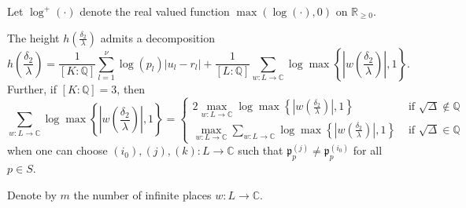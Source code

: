 Let $\log^+(\cdot)$ denote the real valued function $\max(\log(\cdot), 0)$ on $\mathbb{R}_{\geq 0}$. 

\begin{proposition}\label{prop:heightdecomp}
The height $h\left(\frac{\delta_2}{\lambda}\right)$ admits a decomposition
\[h\left(\frac{\delta_2}{\lambda}\right) = \frac{1}{[K:\mathbb{Q}]}\sum_{l = 1}^{\nu} \log(p_l)|u_l - r_l| + \frac{1}{[L:\mathbb{Q}]}\sum_{w :L \to \mathbb{C}} \log \max \left\{ \left|w\left(\frac{\delta_2}{\lambda}\right)\right|, 1\right\}.\]
Further, if $[K:\mathbb{Q}] = 3$, then
\[\sum_{w :L \to \mathbb{C}} \log \max \left\{ \left|w\left(\frac{\delta_2}{\lambda}\right)\right|, 1\right\} = 
\begin{cases}
2\max_{w:L\to \mathbb{C}} \log \max \left\{ \left|w\left(\frac{\delta_2}{\lambda}\right)\right|, 1\right\} & \text{ if } \sqrt{\Delta}\notin\mathbb{Q} \\
\max_{w:L\to \mathbb{C}}\sum_{w :L \to \mathbb{C}} \log \max \left\{ \left|w\left(\frac{\delta_2}{\lambda}\right)\right|, 1\right\} & \text{ if } \sqrt{\Delta}\in\mathbb{Q}
\end{cases}\]
when one can choose $(i_0),(j), (k) : L \to \mathbb{C}$ such that $\mathfrak{p}_{p}^{(j)} \neq \mathfrak{p}_{p}^{(i_0)}$ for all $p \in S$. 
\end{proposition}
Denote by $m$ the number of infinite places $w: L \to \mathbb{C}$. 

